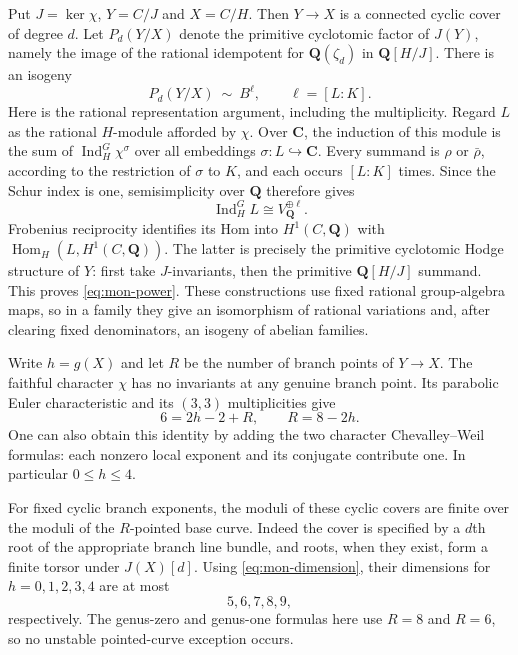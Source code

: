Put $J=\ker\chi$, $Y=C/J$ and $X=C/H$. Then $Y\to X$ is a connected
cyclic cover of degree $d$. Let $P_d(Y/X)$ denote the primitive
cyclotomic factor of $J(Y)$, namely the image of the rational idempotent
for $\mathbf Q(\zeta_d)$ in $\mathbf Q[H/J]$. There is an isogeny
\begin{equation}\label{eq:mon-power}
           P_d(Y/X)\ \sim\ B^{\ell},\qquad \ell=[L:K].
\end{equation}
Here is the rational representation argument, including the multiplicity.
Regard $L$ as the rational $H$-module afforded by $\chi$. Over $\mathbf C$,
the induction of this module is the sum of $\operatorname{Ind}_H^G\chi^\sigma$
over all embeddings $\sigma:L\hookrightarrow\mathbf C$. Every summand is
$\rho$ or $\bar\rho$, according to the restriction of $\sigma$ to $K$,
and each occurs $[L:K]$ times. Since the Schur index is one, semisimplicity
over $\mathbf Q$ therefore gives
\[
             \operatorname{Ind}_H^G L\cong V_{\mathbf Q}^{\oplus\ell}.
\]
Frobenius reciprocity identifies its Hom into $H^1(C,\mathbf Q)$ with
$\operatorname{Hom}_H(L,H^1(C,\mathbf Q))$. The latter is precisely
the primitive cyclotomic Hodge structure of $Y$: first take $J$-invariants,
then the primitive $\mathbf Q[H/J]$ summand. This proves
\eqref{eq:mon-power}. These constructions use fixed rational group-algebra
maps, so in a family they give an isomorphism of rational variations and,
after clearing fixed denominators, an isogeny of abelian families.

Write $h=g(X)$ and let $R$ be the number of branch points of $Y\to X$.
The faithful character $\chi$ has no invariants at any genuine branch
point. Its parabolic Euler characteristic and its $(3,3)$ multiplicities
give
\begin{equation}\label{eq:mon-dimension}
                  6=2h-2+R,\qquad R=8-2h.
\end{equation}
One can also obtain this identity by adding the two character
Chevalley--Weil formulas: each nonzero local exponent and its conjugate
contribute one. In particular $0\le h\le4$.

For fixed cyclic branch exponents, the moduli of these cyclic covers are
finite over the moduli of the $R$-pointed base curve. Indeed the cover is
specified by a $d$th root of the appropriate branch line bundle, and roots,
when they exist, form a finite torsor under $J(X)[d]$. Using
\eqref{eq:mon-dimension}, their dimensions for $h=0,1,2,3,4$ are at most
\[
                              5,6,7,8,9,
\]
respectively. The genus-zero and genus-one formulas here use $R=8$ and
$R=6$, so no unstable pointed-curve exception occurs.

